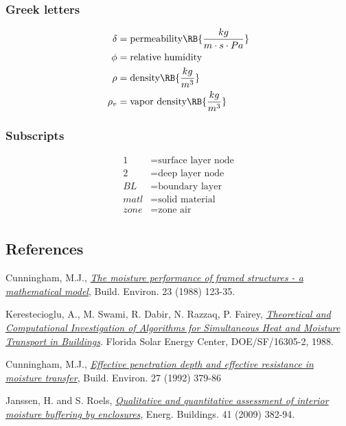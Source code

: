 \subsubsection{Greek letters}\label{greek-letters}
\begin{align*}
  \delta  &= \text{permeability} \RB{\frac{kg}{m \cdot s \cdot Pa}} \\
  \phi &= \text{relative humidity} \\
  \rho &= \text{density} \RB{\frac{kg}{m^{3}}} \\
  \rho_{v} &= \text{vapor density} \RB{\frac{kg}{m^{3}}} \\
\end{align*}

\subsubsection{Subscripts}\label{subscripts-and-superscripts}
\begin{align*}
	1 &= \text{surface layer node} \\
	2 &= \text{deep layer node} \\
	BL &= \text{boundary layer} \\
	matl &= \text{solid material} \\
	zone &= \text{zone air} \\
\end{align*}

\subsection{References}\label{references-019}

Cunningham, M.J.,
\href{http://www.sciencedirect.com/science/article/pii/0360132388900261}{\emph{The
		moisture performance of framed structures - a mathematical model}},
Build. Environ. 23 (1988) 123-35.

Kerestecioglu, A., M. Swami, R. Dabir, N. Razzaq, P. Fairey,
\href{http://www.fsec.ucf.edu/en/publications/pdf/FSEC-CR-191-88.pdf}{\emph{Theoretical
		and Computational Investigation of Algorithms for Simultaneous Heat and
		Moisture Transport in Buildings}}. Florida Solar Energy Center,
DOE/SF/16305-2, 1988.

Cunningham, M.J.,
\href{http://www.sciencedirect.com/science/article/pii/036013239290037P}{\emph{Effective
		penetration depth and effective resistance in moisture transfer}},
Build. Environ. 27 (1992) 379-86

Janssen, H. and S. Roels,
\href{http://www.sciencedirect.com/science/article/pii/S0378778808002387}{\emph{Qualitative
		and quantitative assessment of interior moisture buffering by
		enclosures}}, Energ. Buildings. 41 (2009) 382-94.

